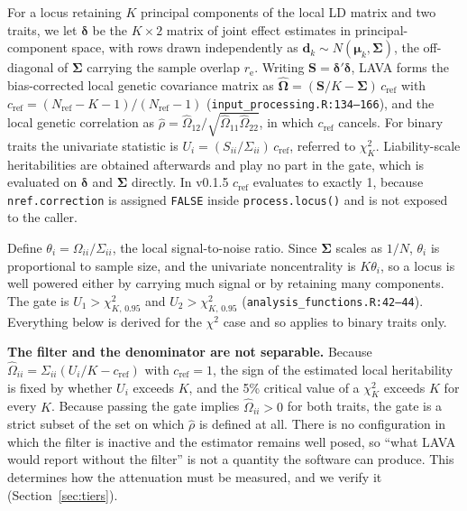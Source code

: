 \documentclass[12pt,a4paper]{article}
\newcommand{\rh}{\hat{\rho}}
\newcommand{\Om}{\bm{\Omega}}
\newcommand{\Sig}{\bm{\Sigma}}
\newcommand{\re}{r_{\mathrm{e}}}
\newcommand{\crf}{c_{\mathrm{ref}}}
\newcommand{\Nref}{N_{\mathrm{ref}}}
\begin{document}
For a locus retaining $K$ principal components of the local LD matrix and two traits,
we let $\bm{\delta}$ be the $K\times2$ matrix of joint effect estimates in
principal-component space, with rows drawn independently as
$\bm{d}_k\sim N(\bm{\mu}_k,\Sig)$, the off-diagonal of $\Sig$ carrying the sample
overlap $\re$. Writing $\bm{S}=\bm{\delta}'\bm{\delta}$, LAVA forms the bias-corrected
local genetic covariance matrix as $\hat{\Om}=(\bm{S}/K-\Sig)\,\crf$ with
$\crf=(\Nref-K-1)/(\Nref-1)$ (\texttt{input\_processing.R:134--166}), and the local
genetic correlation as $\rh=\hat\Omega_{12}/\sqrt{\hat\Omega_{11}\hat\Omega_{22}}$, in
which $\crf$ cancels. For binary traits the univariate statistic is
$U_i=(S_{ii}/\Sigma_{ii})\,\crf$, referred to $\chi^2_K$. Liability-scale heritabilities
are obtained afterwards \citep{ref15} and play no part in the gate, which is evaluated on
$\bm{\delta}$ and $\Sig$ directly. In v0.1.5 $\crf$ evaluates to
exactly 1, because \texttt{nref.correction} is assigned \texttt{FALSE} inside
\texttt{process.locus()} and is not exposed to the caller.

Define $\theta_i=\Omega_{ii}/\Sigma_{ii}$, the local signal-to-noise ratio. Since $\Sig$
scales as $1/N$, $\theta_i$ is proportional to sample size, and the univariate
noncentrality is $K\theta_i$, so a locus is well powered either by carrying much signal or
by retaining many components. The gate is $U_1>\chi^2_{K,\,0.95}$ and
$U_2>\chi^2_{K,\,0.95}$ (\texttt{analysis\_functions.R:42--44}). Everything below is
derived for the $\chi^2$ case and so applies to binary traits only.

\medskip
\noindent\textbf{The filter and the denominator are not separable.} Because
$\hat\Omega_{ii}=\Sigma_{ii}(U_i/K-\crf)$ with $\crf=1$, the sign of the estimated local
heritability is fixed by whether $U_i$ exceeds $K$, and the 5\% critical value of a
$\chi^2_K$ exceeds $K$ for every $K$. Because passing the gate implies
$\hat\Omega_{ii}>0$ for both traits, the gate is a strict subset of the set on which
$\rh$ is defined at all. There is no configuration in which the filter is inactive and
the estimator remains well posed, so ``what LAVA would report without the filter'' is
not a quantity the software can produce. This determines how the attenuation must be
measured, and we verify it (Section~\ref{sec:tiers}).
\end{document}
